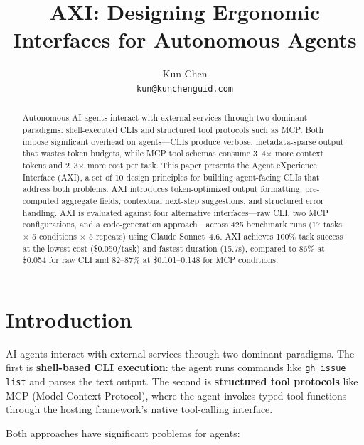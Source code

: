 \documentclass{article}
\title{AXI: Designing Ergonomic Interfaces for Autonomous Agents}
\author{
  Kun Chen \\
  \texttt{kun@kunchenguid.com}
}
\begin{document}
\maketitle

\begin{abstract}
Autonomous AI agents interact with external services through two dominant
paradigms: shell-executed CLIs and structured tool protocols such as MCP.
Both impose significant overhead on agents---CLIs produce verbose,
metadata-sparse output that wastes token budgets, while MCP tool schemas
consume 3--4$\times$ more context tokens and 2--3$\times$ more cost per task.
This paper presents the Agent eXperience Interface (AXI), a set of 10 design
principles for building agent-facing CLIs that address both problems. AXI
introduces token-optimized output formatting, pre-computed aggregate fields,
contextual next-step suggestions, and structured error handling.
AXI is evaluated against four alternative interfaces---raw CLI, two MCP
configurations, and a code-generation approach---across 425 benchmark runs
(17 tasks $\times$ 5 conditions $\times$ 5 repeats) using Claude Sonnet~4.6.
AXI achieves 100\% task success at the lowest cost (\$0.050/task) and fastest
duration (15.7s), compared to 86\% at \$0.054 for raw CLI and 82--87\% at
\$0.101--0.148 for MCP conditions.
\end{abstract}


\section{Introduction}
\label{sec:intro}

AI agents interact with external services through two dominant paradigms.
The first is \textbf{shell-based CLI execution}: the agent runs commands like
\texttt{gh issue list} and parses the text output. The second is
\textbf{structured tool protocols} like MCP (Model Context Protocol), where
the agent invokes typed tool functions through the hosting framework's native
tool-calling interface.

Both approaches have significant problems for agents:
\end{document}
